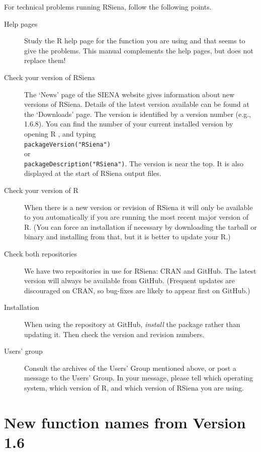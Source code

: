 \documentclass[a4paper,fleqn,11pt]{article}
\newcommand{\+}{\, + \,}
\newcommand{\R}{{\sf R }}
\newcommand{\Rn}{{\sf R}}
\newcommand{\rs}{{\sf RSiena}}
\newcommand{\RS}{{\sf \textsf{RSiena} }}
\newcommand{\SI}{{\sf SIENA }}
\begin{document}
For technical problems running \rs, follow the following points.
\begin{description}
\item[Help pages] Study the \R help page for the function you are using and that seems to give
      the problems. This manual complements the help pages,
      but does not replace them!
\item[Check your version of \RS]
  The `News' page of the \SI website gives information about new versions
  of \rs. Details of the latest version available can
  be found at the `Downloads' page.
  The version is
  identified by a version number (e.g., 1.6.8).
  You can find the number of your current installed version by
  opening \R, and typing\\
  \verb|packageVersion("RSiena")|   \\
  or \\
  \verb|packageDescription("RSiena")|. The version is
  near the top. It is also displayed at the
  start of \RS output files.
\item[Check your version of \Rn] When there is a new version or revision of \RS
  it will only be available to you automatically if you are running the most
  recent major version of \Rn. (You can force an installation if
  necessary by downloading the tarball or binary and installing from that, but
  it is better to update your \Rn.)
\item [Check both repositories] We have two repositories in use for \rs: CRAN
  and GitHub. The latest version will always be available from
  GitHub. (Frequent updates are discouraged on CRAN, so bug-fixes are likely to
  appear first on GitHub.)
\item[Installation] When using the repository at GitHub, \emph{install} the
  package rather than updating it. Then check the version and revision numbers.
\item[Users' group] Consult the archives of the Users' Group mentioned above, or post
     a message to the Users' Group. In your message,
     please tell which operating system, which version of \Rn, and which version
     of \RS you are using.
\end{description}

\newpage

\section{New function names from Version 1.6}
\label{S_names}
\end{document}
